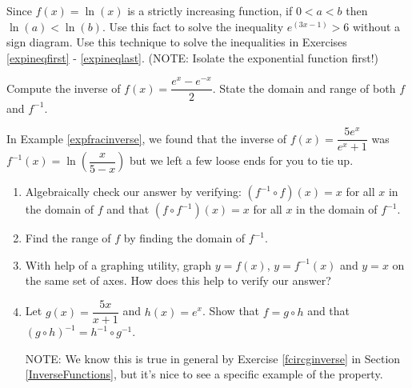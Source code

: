 \documentclass{ximera}
\begin{document}
\begin{problem}\label{onetoonelogexercise} 
Since $f(x) = \ln(x)$ is a strictly increasing function, if $0 < a < b$ then $\ln(a) < \ln(b)$.  Use this fact to solve the inequality $e^{(3x - 1)} > 6$ without a sign diagram. Use this technique to solve the inequalities in Exercises \ref{expineqfirst} - \ref{expineqlast}. (NOTE:  Isolate the exponential function first!)
\end{problem}

\begin{problem}\label{hyperbolicsine} 
Compute the inverse of $f(x) = \dfrac{e^{x} - e^{-x}}{2}$.  State the domain and range of both $f$ and $f^{-1}$. 
\end{problem}

\begin{problem}\label{checkingexpfracinverse} 
In Example \ref{expfracinverse}, we found that the inverse of $f(x) = \dfrac{5e^{x}}{e^{x}+1}$ was $f^{-1}(x) = \ln\left(\dfrac{x}{5-x}\right)$ but we left a few loose ends for you to tie up.  

\begin{enumerate}

\item Algebraically check our answer by verifying: $\left(f^{-1} \circ f\right)(x) = x$ for all $x$ in the domain of $f$ and that $\left(f \circ f^{-1}\right)(x) = x$ for all $x$ in the domain of $f^{-1}$.

\item Find the range of $f$ by finding the domain of $f^{-1}$.

\item With help of a graphing utility, graph $y = f(x)$,  $y = f^{-1}(x)$ and $y = x$ on the same set of axes.  How does this help to verify our answer?

\item Let $g(x) = \dfrac{5x}{x+1}$ and $h(x) = e^{x}$.  Show that $f = g \circ h$ and that $(g \circ h)^{-1} = h^{-1} \circ g^{-1}$. 

NOTE:  We know this is true in general by Exercise \ref{fcircginverse} in Section \ref{InverseFunctions}, but it's nice to see a specific example of the property.

\end{enumerate}
\end{problem}
\end{document}
